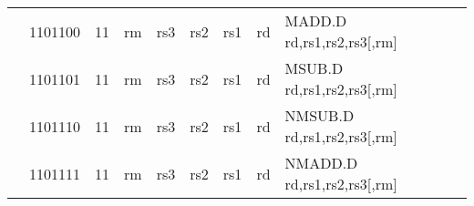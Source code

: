 \begin{table}[p]
\begin{small}
\begin{center}
\begin{tabular}{rcccccccccl}
&
\multicolumn{1}{|c|}{1101100} &
\multicolumn{1}{c|}{11} &
\multicolumn{2}{c|}{rm} &
\multicolumn{2}{c|}{rs3} &
\multicolumn{1}{c|}{rs2} &
\multicolumn{1}{c|}{rs1} &
\multicolumn{1}{c|}{rd} & MADD.D rd,rs1,rs2,rs3[,rm] \\
\cline{2-10}
  

&
\multicolumn{1}{|c|}{1101101} &
\multicolumn{1}{c|}{11} &
\multicolumn{2}{c|}{rm} &
\multicolumn{2}{c|}{rs3} &
\multicolumn{1}{c|}{rs2} &
\multicolumn{1}{c|}{rs1} &
\multicolumn{1}{c|}{rd} & MSUB.D rd,rs1,rs2,rs3[,rm] \\
\cline{2-10}
  

&
\multicolumn{1}{|c|}{1101110} &
\multicolumn{1}{c|}{11} &
\multicolumn{2}{c|}{rm} &
\multicolumn{2}{c|}{rs3} &
\multicolumn{1}{c|}{rs2} &
\multicolumn{1}{c|}{rs1} &
\multicolumn{1}{c|}{rd} & NMSUB.D rd,rs1,rs2,rs3[,rm] \\
\cline{2-10}
  

&
\multicolumn{1}{|c|}{1101111} &
\multicolumn{1}{c|}{11} &
\multicolumn{2}{c|}{rm} &
\multicolumn{2}{c|}{rs3} &
\multicolumn{1}{c|}{rs2} &
\multicolumn{1}{c|}{rs1} &
\multicolumn{1}{c|}{rd} & NMADD.D rd,rs1,rs2,rs3[,rm] \\
\cline{2-10}
  

\end{tabular}
\end{center}
\end{small}

\label{instr-table}
\end{table}
  

\newpage

